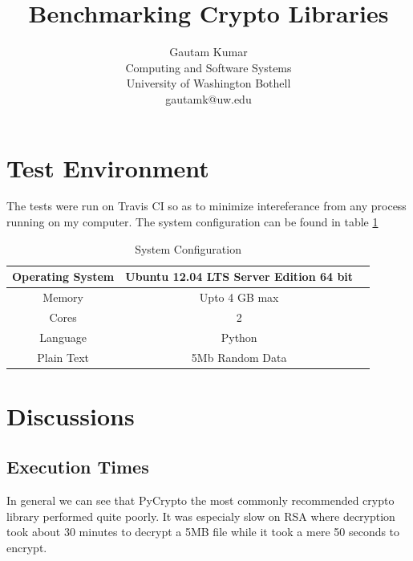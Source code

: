 \documentclass[10pt,conference]{IEEEtran}
\begin{document}
\title{Benchmarking Crypto Libraries}


\author{
{\rm Gautam Kumar}\\
Computing and Software Systems\\
University of Washington Bothell\\
gautamk@uw.edu
} %

\maketitle
\thispagestyle{empty}

\section{Test Environment}

The tests were run on Travis CI so as to minimize intereferance from any process running on my computer. The system configuration can be found in table \ref{table:system}


 
\begin{table}[]
\centering
\caption{System Configuration}
\label{table:system}
\begin{tabular}{|c|c|c|}
\hline 
Operating System & Ubuntu 12.04 LTS Server Edition 64 bit     \\ \hline
Memory           & Upto 4 GB max                              \\ \hline
Cores            & 2                                       \\ \hline
Language         & Python \\ \hline
Plain Text       & 5Mb Random Data \\ \hline
\end{tabular}
\end{table} 

\section{Discussions}

\subsection{Execution Times}

In general we can see that PyCrypto the most commonly recommended crypto library performed quite poorly. It was especialy slow on RSA where decryption took about 30 minutes to decrypt a 5MB file while it took a mere 50 seconds to encrypt.
\end{document}
